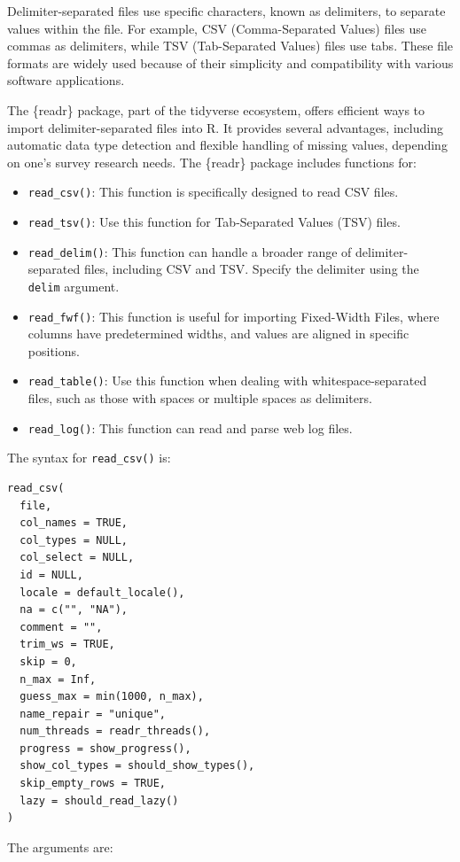 \documentclass[
]{krantz}
\providecommand{\tightlist}{%
  \setlength{\itemsep}{0pt}\setlength{\parskip}{0pt}}
\begin{document}
Delimiter-separated files use specific characters, known as delimiters, to separate values within the file. For example, CSV (Comma-Separated Values) files use commas as delimiters, while TSV (Tab-Separated Values) files use tabs. These file formats are widely used because of their simplicity and compatibility with various software applications.

The \{readr\} package, part of the tidyverse ecosystem, offers efficient ways to import delimiter-separated files into R. It provides several advantages, including automatic data type detection and flexible handling of missing values, depending on one's survey research needs. The \{readr\} package includes functions for:

\begin{itemize}
\tightlist
\item
  \texttt{read\_csv()}: This function is specifically designed to read CSV files.
\item
  \texttt{read\_tsv()}: Use this function for Tab-Separated Values (TSV) files.
\item
  \texttt{read\_delim()}: This function can handle a broader range of delimiter-separated files, including CSV and TSV. Specify the delimiter using the \texttt{delim} argument.
\item
  \texttt{read\_fwf()}: This function is useful for importing Fixed-Width Files, where columns have predetermined widths, and values are aligned in specific positions.
\item
  \texttt{read\_table()}: Use this function when dealing with whitespace-separated files, such as those with spaces or multiple spaces as delimiters.
\item
  \texttt{read\_log()}: This function can read and parse web log files.
\end{itemize}

The syntax for \texttt{read\_csv()} is:

\begin{verbatim}
read_csv(
  file,
  col_names = TRUE,
  col_types = NULL,
  col_select = NULL,
  id = NULL,
  locale = default_locale(),
  na = c("", "NA"),
  comment = "",
  trim_ws = TRUE,
  skip = 0,
  n_max = Inf,
  guess_max = min(1000, n_max),
  name_repair = "unique",
  num_threads = readr_threads(),
  progress = show_progress(),
  show_col_types = should_show_types(),
  skip_empty_rows = TRUE,
  lazy = should_read_lazy()
)
\end{verbatim}

The arguments are:
\end{document}
